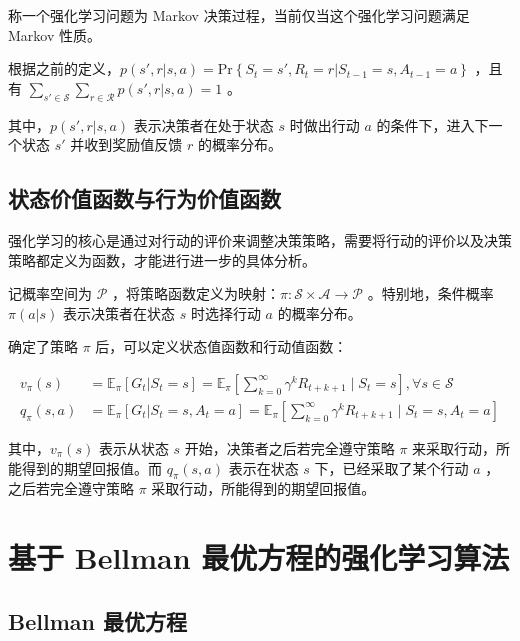 \begin{Definition}
    称一个强化学习问题为 Markov 决策过程，当前仅当这个强化学习问题满足 Markov 性质\cite{sutton2018reinforcement}\cite{howard1960dynamic}。
\end{Definition}

根据之前的定义，$p(s',r|s,a) =\mathrm{Pr}\left\{S_t=s',R_t=r|S_{t-1}=s,A_{t-1}=a\right\}$ ，且有 $\sum_{s'\in\mathcal{S}}\sum_{r\in\mathcal{R}}p(s',r|s,a)=1$ 。

其中，$p(s',r|s,a)$ 表示决策者在处于状态 $s$ 时做出行动 $a$ 的条件下，进入下一个状态 $s'$ 并收到奖励值反馈 $r$ 的概率分布。

\subsection{状态价值函数与行为价值函数}

强化学习的核心是通过对行动的评价来调整决策策略，需要将行动的评价以及决策策略都定义为函数，才能进行进一步的具体分析。

记概率空间为 $\mathcal P$ ，将策略函数定义为映射：$\pi:\mathcal{S}\times\mathcal{A}\to \mathcal{P}$ 。特别地，条件概率 $\pi(a|s)$ 表示决策者在状态 $s$ 时选择行动 $a$ 的概率分布。

确定了策略 $\pi$ 后，可以定义状态值函数和行动值函数：

\begin{equation}
    \begin{aligned}
        v_{\pi}(s) &=\mathbb{E}_{\pi}\left[G_t|S_t=s\right]=\mathbb{E}_{\pi}\left[\sum_{k=0}^{\infty}\gamma^kR_{t+k+1}\mid S_t=s\right], \forall s \in \mathcal{S}\\
        q_{\pi}(s,a) &=\mathbb{E}_{\pi}\left[G_t|S_t=s,A_t=a\right]=\mathbb{E}_{\pi}\left[\sum_{k=0}^{\infty}\gamma^kR_{t+k+1}\mid S_t=s,A_t=a\right]
    \end{aligned}
\end{equation}

其中，$v_\pi(s)$ 表示从状态 $s$ 开始，决策者之后若完全遵守策略 $\pi$ 来采取行动，所能得到的期望回报值。而 $q_\pi(s,a)$ 表示在状态 $s$ 下，已经采取了某个行动 $a$ ，之后若完全遵守策略 $\pi$ 采取行动，所能得到的期望回报值。

\section{基于 Bellman 最优方程的强化学习算法}

\subsection{Bellman 最优方程}

